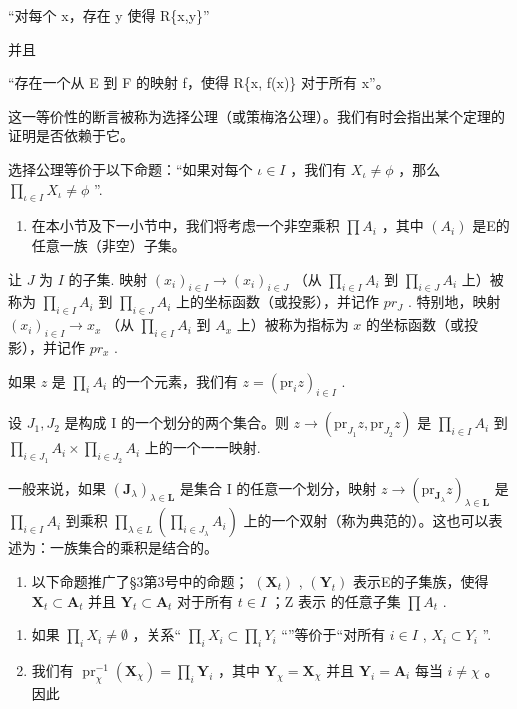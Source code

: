 “对每个 x，存在 y 使得 R\{x,y\}''

并且

“存在一个从 E 到 F 的映射 f，使得 R\{x, f(x)\} 对于所有 x''。

这一等价性的断言被称为选择公理（或策梅洛公理）。我们有时会指出某个定理的证明是否依赖于它。

选择公理等价于以下命题：“如果对每个 \(\iota\in I\) ，我们有 \(X_{\iota}\neq\phi\) ，那么 \(\prod_{\iota\in I}X_{\iota}\neq\phi\) ''.

\begin{enumerate}
\def\labelenumi{\arabic{enumi}.}
\setcounter{enumi}{10}
\tightlist
\item
  在本小节及下一小节中，我们将考虑一个非空乘积 \(\prod A_{i}\) ，其中 \((A_{i})\) 是E的任意一族（非空）子集。
\end{enumerate}

让 \(J\) 为 \(I\) 的子集. 映射 \((x_{i})_{i\in I}\to(x_{i})_{i\in J}\) （从 \(\prod_{i\in I}A_{i}\) 到 \(\prod_{i\in J}A_{i}\) 上）被称为 \(\prod_{i\in I}A_{i}\) 到 \(\prod_{i\in J}A_{i}\) 上的坐标函数（或投影），并记作 \(pr_{J}\) . 特别地，映射 \((x_{i})_{i\in I}\to x_{x}\) （从 \(\prod_{i\in I}A_{i}\) 到 \(A_{x}\) 上）被称为指标为 \(x\) 的坐标函数（或投影），并记作 \(pr_{x}\) .

如果 \(z\) 是 \(\prod_{i} A_{i}\) 的一个元素，我们有 \(z = (\mathrm{pr}_{i}z)_{i \in I}\) .

设 \(J_1, J_2\) 是构成 I 的一个划分的两个集合。则 \(z \to (\mathrm{pr}_{J_1}z, \mathrm{pr}_{J_2}z)\) 是 \(\prod_{i\in I} A_i\) 到 \(\prod_{i\in J_1} A_i \times \prod_{i\in J_2} A_i\) 上的一个一一映射.

一般来说，如果 \((\mathbf{J}_{\lambda})_{\lambda \in \mathbf{L}}\) 是集合 I 的任意一个划分，映射 \(z \to (\mathrm{pr}_{\mathbf{J}_{\lambda}} z)_{\lambda \in \mathbf{L}}\) 是 \(\prod_{i \in I} A_i\) 到乘积 \(\prod_{\lambda \in L} \left( \prod_{i \in J_{\lambda}} A_i \right)\) 上的一个双射（称为典范的）。这也可以表述为：一族集合的乘积是结合的。

\begin{enumerate}
\def\labelenumi{\arabic{enumi}.}
\setcounter{enumi}{11}
\tightlist
\item
  以下命题推广了§3第3号中的命题； \((\mathbf{X}_t)\) , \((\mathbf{Y}_t)\) 表示E的子集族，使得 \(\mathbf{X}_t \subset \mathbf{A}_t\) 并且 \(\mathbf{Y}_t \subset \mathbf{A}_t\) 对于所有 \(t \in I\) ；Z 表示 的任意子集 \(\prod A_t\) .
\end{enumerate}

\begin{enumerate}
\def\labelenumi{(\alph{enumi})}
\item
  如果 \(\prod_{i} X_{i} \neq \emptyset\) ，关系“ \(\prod_{i} X_{i} \subset \prod_{i} Y_{i}\) “”等价于“对所有 \(i \in I\) , \(X_{i} \subset Y_{i}\) ''.
\item
  我们有 \(\operatorname{pr}_{\chi}^{-1}(\mathbf{X}_{\chi}) = \prod_{i} \mathbf{Y}_{i}\) ，其中 \(\mathbf{Y}_{\chi} = \mathbf{X}_{\chi}\) 并且 \(\mathbf{Y}_{i} = \mathbf{A}_{i}\) 每当 \(i \neq \chi\) 。因此
\end{enumerate}

